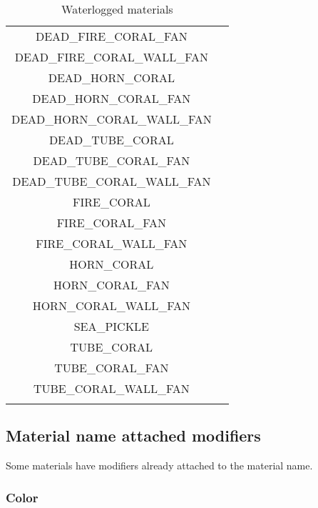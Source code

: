 \begin{longtable}{ |c|c| }
	DEAD\_FIRE\_CORAL\_FAN & \cmark \\
	DEAD\_FIRE\_CORAL\_WALL\_FAN & \cmark \\
	DEAD\_HORN\_CORAL & \cmark \\
	DEAD\_HORN\_CORAL\_FAN & \cmark \\
	DEAD\_HORN\_CORAL\_WALL\_FAN & \cmark \\
	DEAD\_TUBE\_CORAL & \cmark \\
	DEAD\_TUBE\_CORAL\_FAN & \cmark \\
	DEAD\_TUBE\_CORAL\_WALL\_FAN & \cmark \\
	FIRE\_CORAL & \cmark \\
	FIRE\_CORAL\_FAN & \cmark \\
	FIRE\_CORAL\_WALL\_FAN & \cmark \\
	HORN\_CORAL & \cmark \\
	HORN\_CORAL\_FAN & \cmark \\
	HORN\_CORAL\_WALL\_FAN & \cmark \\
	SEA\_PICKLE & \cmark \\
	TUBE\_CORAL & \cmark \\
	TUBE\_CORAL\_FAN & \cmark \\
	TUBE\_CORAL\_WALL\_FAN & \cmark \\
	\hline
	\caption{Waterlogged materials}
\end{longtable}


\subsection{Material name attached modifiers}
Some materials have modifiers already attached to the material name.

\subsubsection{Color}\label{spigot-types:color}

